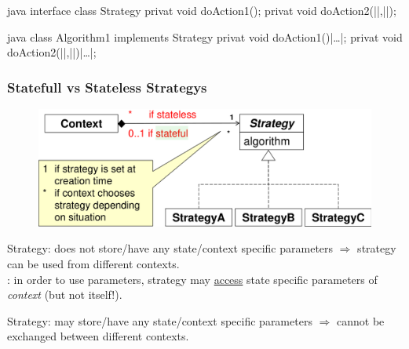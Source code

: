 \begin{codeboxNl}{java}
  interface class Strategy {
    privat void doAction1();
    privat void doAction2(|\ul{}|,||);
}
\end{codeboxNl}
\begin{codeboxNl}{java}
  class Algorithm1 implements Strategy {
    privat void doAction1(){|\ldots|};
    privat void doAction2(|\ul{}|,||){|\ldots|};
}
\end{codeboxNl}
\subsubsection{Statefull vs Stateless Strategys}
\label{subsubsec:statefullVsStateless}
\begin{sectionbox}\nospacing
\begin{figure}[H]
  \centering
  \includegraphics[width=1.0\columnwidth]{figures/strategyStatefulVsStateless.png}
  \label{fig:StatefullVsStateless}
\end{figure}
 \begin{itemizenosep}
     \item {} Strategy: does not store/have any state/context
   specific parameters $\Rightarrow$ strategy can be used from different
   contexts.\\
   : in order to use parameters, strategy may \ul{access} state
   specific parameters of \textit{context} (but not itself!).
     \item {} Strategy: may store/have any state/context specific
   parameters $\Rightarrow$ cannot be exchanged between different contexts.
 \end{itemizenosep} 
\end{sectionbox}
